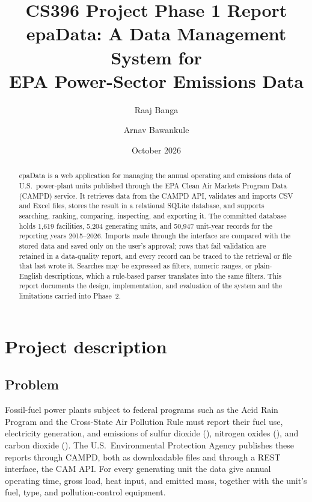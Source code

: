 \documentclass[11pt,a4paper]{article}
\title{%
  \vspace*{-1em}
  {\Large CS396 Project Phase 1 Report}\\[0.8em]
  \textbf{epaData}: A Data Management System for\\EPA Power-Sector Emissions Data}
\author{Raaj Banga \and Arnav Bawankule}
\date{October 2026}
\begin{document}
\maketitle

\begin{abstract}
\noindent
epaData is a web application for managing the annual operating and emissions data of U.S.\
power-plant units published through the EPA Clean Air Markets Program Data (CAMPD) service. It
retrieves data from the CAMPD API, validates and imports CSV and Excel files, stores the result
in a relational SQLite database, and supports searching, ranking, comparing, inspecting, and
exporting it. The committed database holds 1,619 facilities, 5,204 generating units, and 50,947
unit-year records for the reporting years 2015--2026. Imports made through the interface are
compared with the stored data and saved only on the user's approval; rows that fail validation
are retained in a data-quality report, and every record can be traced to the retrieval or file
that last wrote it. Searches may be expressed as filters, numeric ranges, or plain-English
descriptions, which a rule-based parser translates into the same filters. This report documents
the design, implementation, and evaluation of the system and the limitations carried into
Phase~2.
\end{abstract}

\tableofcontents
\newpage

\section{Project description}
\label{sec:description}

\subsection{Problem}

Fossil-fuel power plants subject to federal programs such as the Acid Rain Program and the
Cross-State Air Pollution Rule must report their fuel use, electricity generation, and
emissions of sulfur dioxide (\SOtwo), nitrogen oxides (\NOx), and carbon dioxide (\COtwo). The
U.S.\ Environmental Protection Agency publishes these reports through CAMPD, both as
downloadable files and through a REST interface, the CAM API. For every generating unit the
data give annual operating time, gross load, heat input, and emitted mass, together with the
unit's fuel, type, and pollution-control equipment.
\end{document}
